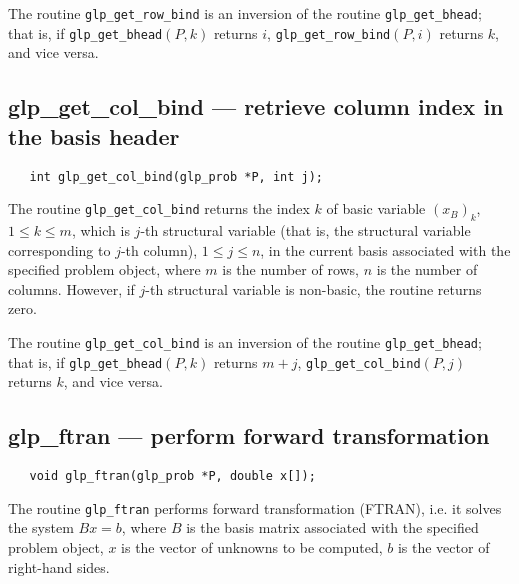 \newpage


The routine \verb|glp_get_row_bind| is an inversion of the routine
\verb|glp_get_bhead|; that is, if \linebreak
\verb|glp_get_bhead|$(P,k)$ returns $i$,
\verb|glp_get_row_bind|$(P,i)$ returns $k$, and vice versa.

\subsection{glp\_get\_col\_bind --- retrieve column index in the basis
header}

\synopsis

\begin{verbatim}
   int glp_get_col_bind(glp_prob *P, int j);
\end{verbatim}

\returns

The routine \verb|glp_get_col_bind| returns the index $k$ of basic
variable $(x_B)_k$, $1\leq k\leq m$, which is $j$-th structural
variable (that is, the structural variable corresponding to $j$-th
column), $1\leq j\leq n$, in the current basis associated with the
specified problem object, where $m$ is the number of rows, $n$ is the
number of columns. However, if $j$-th structural variable is non-basic,
the routine returns zero.


The routine \verb|glp_get_col_bind| is an inversion of the routine
\verb|glp_get_bhead|; that is, if \linebreak
\verb|glp_get_bhead|$(P,k)$ returns $m+j$,
\verb|glp_get_col_bind|$(P,j)$ returns $k$, and vice versa.

\subsection{glp\_ftran --- perform forward transformation}

\synopsis

\begin{verbatim}
   void glp_ftran(glp_prob *P, double x[]);
\end{verbatim}

\description

The routine \verb|glp_ftran| performs forward transformation (FTRAN),
i.e. it solves the system $Bx=b$, where $B$ is the basis matrix
associated with the specified problem object, $x$ is the vector of
unknowns to be computed, $b$ is the vector of right-hand sides.

